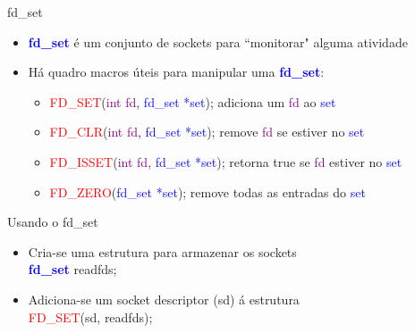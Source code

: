 \documentclass[10pt, xcolor=x11names]{beamer}
\begin{document}
\begin{frame}
	\begin{block}{fd\_set}
	
		\begin{itemize}[<+->]
			\item \textcolor{blue}{\textbf{fd\_set}} é um conjunto de sockets para ``monitorar" alguma atividade

			\item Há quadro macros úteis para manipular uma \textcolor{blue}{\textbf{fd\_set}}:
			\begin{itemize}[<+->]
				\item \textcolor{red}{FD\_SET}(\textcolor{purple}{int fd}, \textcolor{blue}{fd\_set *set}); adiciona um \textcolor{purple}{fd} ao \textcolor{blue}{set}

				\item \textcolor{red}{FD\_CLR}(\textcolor{purple}{int fd}, \textcolor{blue}{fd\_set *set}); remove \textcolor{purple}{fd} se estiver no \textcolor{blue}{set}

				\item \textcolor{red}{FD\_ISSET}(\textcolor{purple}{int fd}, \textcolor{blue}{fd\_set *set}); retorna true se \textcolor{purple}{fd} estiver no \textcolor{blue}{set}

				\item \textcolor{red}{FD\_ZERO}(\textcolor{blue}{fd\_set *set}); remove todas as entradas do \textcolor{blue}{set}
			\end{itemize}
		\end{itemize}

	\end{block}
	
\end{frame}


\begin{frame}
	\begin{block}{Usando o fd\_set}
	
		\begin{itemize}[<+->]
			\item Cria-se uma estrutura para armazenar os sockets\\
			\textcolor{blue}{\textbf{fd\_set}} \textcolor[rgb]{.01,.3,.0}{readfds};

			\item Adiciona-se um socket descriptor (sd) á estrutura\\
			 \textcolor{red}{FD\_SET}(sd, \textcolor[rgb]{.01,.3,.0}{readfds});
		\end{itemize}

	\end{block}
	
\end{frame}
\end{document}
